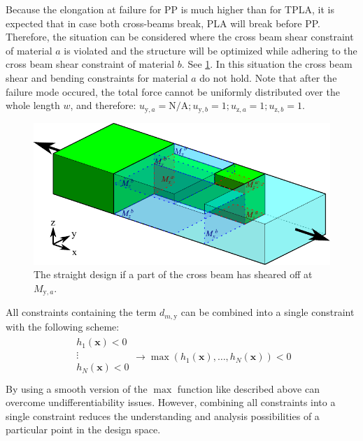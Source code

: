 Because the elongation at failure for PP is much higher than for TPLA, it is expected that in case both cross-beams break, PLA will break before PP.
Therefore, the situation can be considered where the cross beam shear constraint of material $a$ is violated and the structure will be optimized while adhering to the cross beam shear constraint of material $b$.
See \cref{fig:straight_model_broken}.
In this situation the cross beam shear and bending constraints for material $a$ do not hold.
Note that after the failure mode occured, the total force cannot be uniformly distributed over the whole length $w$, and therefore:
$
u_{\text{y},a} = \text{N/A};
u_{\text{y},b} = 1 ;
u_{\text{z},a} = 1 ;
u_{\text{z},b} = 1
$.

\begin{figure}[H]
	\centering
	\includegraphics[width=\columnwidth]{../sources/method/straight_model_v3_broken.pdf}
	\caption{The straight design if a part of the cross beam has sheared off at $M_{\text{y}, a}$.}
	\label{fig:straight_model_broken}
\end{figure}

All constraints containing the term $d_{m, \text{y}}$ can be combined into a single constraint with the following scheme:
\begin{align*}
	\begin{array}{l}
		h_1(\mathbf{x}) < 0 \\
		\vdots \\
		h_N(\mathbf{x}) < 0 \\
	\end{array}
	\to
	\max \left(h_1(\mathbf{x}), \dots, h_N(\mathbf{x}) \right) < 0
\end{align*}
By using a smooth version of the $\max$ function like described above can overcome undifferentiability issues.
However, combining all constraints into a single constraint reduces the understanding and analysis possibilities of a particular point in the design space. 


